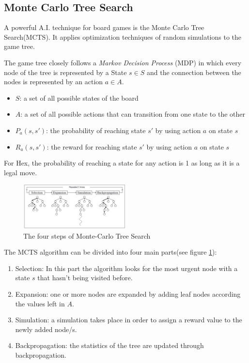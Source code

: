 \documentclass{ba-kecs}
\begin{document}
\subsection{Monte Carlo Tree Search}
A powerful A.I. technique for board games is the Monte Carlo Tree Search(MCTS). It applies optimization techniques of random simulations to the game tree. 

The game tree closely follows a \textit{Markov Decision Process} (MDP) in which every node of the tree is represented by a State $s \in S$ and the connection between the nodes is represented by an action $a \in A$.
\begin{itemize}
\item $S$: a set of all possible states of the board
\item $A$: a set of all possible actions that can transition from one state to the other
\item $P_a(s, s')$: the probability of reaching state $s'$ by using action $a$ on state $s$
\item $R_a(s, s')$: the reward for reaching state $s'$ by using action $a$ on state $s$
\end{itemize}

For Hex, the probability of reaching a state for any action is 1 as long as it is a legal move. 
\begin{figure}
	\centering
	\includegraphics[width=0.5\textwidth]{figure_mcts.jpg}
	\caption{The four steps of Monte-Carlo Tree Search \cite{chaslot2008progressive}}
	\label{fig:mcts}
	\end{figure}
The MCTS algorithm can be divided into four main parts(see figure \ref{fig:mcts}): 
\begin{enumerate}
\item Selection: In this part the algorithm looks for the most urgent node with a state $s$ that hasn't being visited before.
\item Expansion: one or more nodes are expanded by adding leaf nodes according the values left in $A$.
\item Simulation: a simulation takes place in order to assign a reward value to the newly added node/s.
\item Backpropagation: the statistics of the tree are updated through backpropagation.
\end{enumerate}
\end{document}
